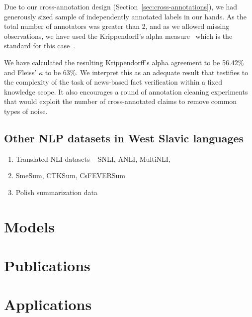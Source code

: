 Due to our cross-annotation design (Section~\ref{sec:cross-annotations}), we had generously sized sample of independently annotated labels in our hands.
As the total number of annotators was greater than 2, and as we allowed missing observations, we have used the Krippendorff's alpha measure~\cite{krippendorff1970} which is the standard for this case~\cite{hayes2007krippendorff}.

We have calculated the resulting Krippendorff's alpha agreement to be 56.42\% and Fleiss' $\kappa$ to be 63\%.
We interpret this as an adequate result that testifies to the complexity of the task of news-based fact verification within a fixed knowledge scope.
It also encourages a round of annotation cleaning experiments that would exploit the number of cross-annotated claims to remove common types of noise.

\subsection{Other NLP datasets in West Slavic languages}
\begin{enumerate}
    \item {\techbf Translated NLI datasets} -- SNLI, ANLI, MultiNLI, 
    \item SmeSum, CTKSum, CsFEVERSum
    \item Polish summarization data
\end{enumerate}
\section{Models}
\label{sec:models}
\section{Publications}
\label{sec:publications}
\section{Applications}
\label{sec:applications}

